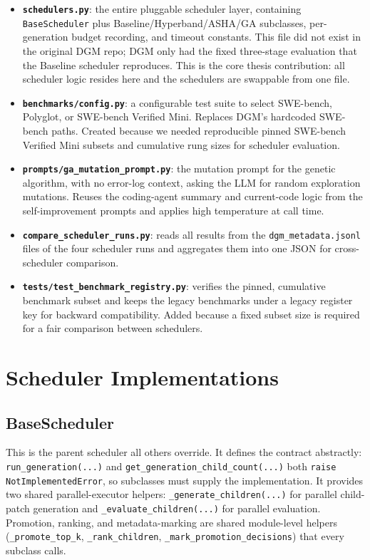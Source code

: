 \begin{itemize}
  \item \textbf{\texttt{schedulers.py}}: the entire pluggable scheduler
    layer, containing \texttt{BaseScheduler} plus
    Baseline/Hyperband/ASHA/GA subclasses, per-generation budget
    recording, and timeout constants. This file did not exist in the
    original DGM repo; DGM only had the fixed three-stage evaluation that
    the Baseline scheduler reproduces. This is the core thesis
    contribution: all scheduler logic resides here and the schedulers are
    swappable from one file.
  \item \textbf{\texttt{benchmarks/config.py}}: a configurable test suite
    to select SWE-bench, Polyglot, or SWE-bench Verified Mini. Replaces
    DGM's hardcoded SWE-bench paths. Created because we needed
    reproducible pinned SWE-bench Verified Mini subsets and cumulative
    rung sizes for scheduler evaluation.
  \item \textbf{\texttt{prompts/ga\_mutation\_prompt.py}}: the mutation
    prompt for the genetic algorithm, with no error-log context, asking
    the LLM for random exploration mutations. Reuses the coding-agent
    summary and current-code logic from the self-improvement prompts and
    applies high temperature at call time.
  \item \textbf{\texttt{compare\_scheduler\_runs.py}}: reads all results
    from the \texttt{dgm\_metadata.jsonl} files of the four scheduler runs
    and aggregates them into one JSON for cross-scheduler comparison.
  \item \textbf{\texttt{tests/test\_benchmark\_registry.py}}: verifies the
    pinned, cumulative benchmark subset and keeps the legacy benchmarks
    under a legacy register key for backward compatibility. Added because
    a fixed subset size is required for a fair comparison between
    schedulers.
\end{itemize}

\section{Scheduler Implementations}
\label{sec:scheduler-impl}

\subsection{BaseScheduler}

This is the parent scheduler all others override. It defines the contract
abstractly: \texttt{run\_generation(...)} and
\texttt{get\_generation\_child\_count(...)} both
\texttt{raise NotImplementedError}, so subclasses must supply the
implementation. It provides two shared parallel-executor helpers:
\texttt{\_generate\_children(...)} for parallel child-patch generation and
\texttt{\_evaluate\_children(...)} for parallel evaluation. Promotion,
ranking, and metadata-marking are shared module-level helpers
(\texttt{\_promote\_top\_k}, \texttt{\_rank\_children},
\texttt{\_mark\_promotion\_decisions}) that every subclass calls.

